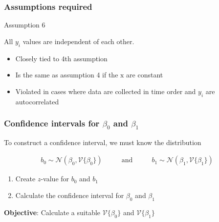 \begin{frame}\frametitle{Assumptions required}
	\begin{block}{Assumption 6}
		\begin{center}
			All $y_i$ values are independent of each other.
		\end{center}
	\end{block}
	\begin{itemize}
		\item	Closely tied to 4th assumption
		\item	Is the same as assumption 4 if the $\mathrm{x}$ are constant
		\item	Violated in cases where data are collected in time order and $y_i$ are autocorrelated
	\end{itemize}
\end{frame}

\begin{frame}\frametitle{Confidence intervals for {\color{red}$\beta_0$ and $\beta_1$}}

	To construct a confidence interval, we must know the distribution

	$$
	\begin{array}{lcr}
		b_0 \sim \mathcal{N}(\beta_0, \mathcal{V}\{\beta_0\}) &\qquad\text{and}\qquad& b_1 \sim \mathcal{N}(\beta_1,\mathcal{V}\{\beta_1\})
	\end{array}
	$$
	\begin{enumerate}
		\item	Create $z$-value for $b_0$ and $b_1$
		\item	Calculate the confidence interval for $\beta_0$ and $\beta_1$
	\end{enumerate}

	\vspace{12pt}
	\textbf{Objective}: Calculate a suitable $\mathcal{V}\{\beta_0\}$ and $\mathcal{V}\{\beta_1\}$
\end{frame}

